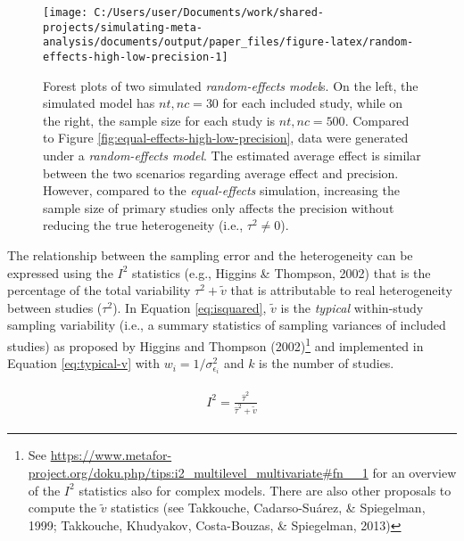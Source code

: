 \documentclass[
  man,floatsintext]{apa6}
\begin{document}
\scriptsize

\begin{figure}[H]

{\centering \texttt{[image: C:/Users/user/Documents/work/shared-projects/simulating-meta-analysis/documents/output/paper\_files/figure-latex/random-effects-high-low-precision-1]} 

}

\caption{Forest plots of two simulated \emph{random-effects model}s. On the left, the simulated model has \(nt,nc = 30\) for each included study, while on the right, the sample size for each study is \(nt,nc = 500\). Compared to Figure \ref{fig:equal-effects-high-low-precision}, data were generated under a \emph{random-effects model}. The estimated average effect is similar between the two scenarios regarding average effect and precision. However, compared to the \emph{equal-effects} simulation, increasing the sample size of primary studies only affects the precision without reducing the true heterogeneity (i.e., \(\tau^{2} \neq 0\)).}\label{fig:random-effects-high-low-precision}
\end{figure}

\normalsize

The relationship between the sampling error and the heterogeneity can be expressed using the \(I^{2}\) statistics (e.g., Higgins \& Thompson, 2002) that is the percentage of the total variability \(\tau^{2} + \tilde{v}\) that is attributable to real heterogeneity between studies (\(\tau^{2}\)). In Equation \eqref{eq:isquared}, \(\tilde{v}\) is the \emph{typical} within-study sampling variability (i.e., a summary statistics of sampling variances of included studies) as proposed by Higgins and Thompson (2002)\footnote{See \url{https://www.metafor-project.org/doku.php/tips:i2_multilevel_multivariate\#fn__1} for an overview of the \(I^2\) statistics also for complex models. There are also other proposals to compute the \(\tilde{v}\) statistics (see Takkouche, Cadarso-Suárez, \& Spiegelman, 1999; Takkouche, Khudyakov, Costa-Bouzas, \& Spiegelman, 2013)} and implemented in Equation \eqref{eq:typical-v} with \(w_i = 1/\sigma_{\epsilon_i}^{2}\) and \(k\) is the number of studies.

\begin{align}
\begin{gathered}
I^2 = \frac{\hat{\tau}^2}{\hat{\tau}^2 + \tilde{v}}
\label{eq:isquared}
\end{gathered}
\end{align}
\end{document}
